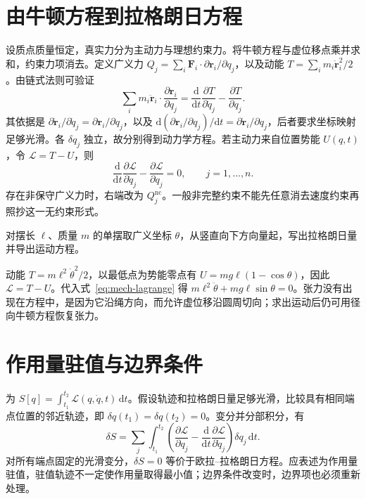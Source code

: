 \documentclass[UTF8,12pt,a4paper,fontset=fandol]{ctexbook}
\begin{document}
\section{由牛顿方程到拉格朗日方程}
设质点质量恒定，真实力分为主动力与理想约束力。将牛顿方程与虚位移点乘并求和，约束力项消去。定义广义力 $Q_j=\sum_i\mathbf F_i\cdot\partial\mathbf r_i/\partial q_j$，以及动能 $T=\sum_i m_i\dot{\mathbf r}_i^2/2$。由链式法则可验证
\[
 \sum_i m_i\ddot{\mathbf r}_i\cdot\frac{\partial\mathbf r_i}{\partial q_j}
 =\frac{\mathrm d}{\mathrm dt}\frac{\partial T}{\partial\dot q_j}-\frac{\partial T}{\partial q_j}.
\]
其依据是 $\partial\dot{\mathbf r}_i/\partial\dot q_j=\partial\mathbf r_i/\partial q_j$，以及 $\mathrm d(\partial\mathbf r_i/\partial q_j)/\mathrm dt=\partial\dot{\mathbf r}_i/\partial q_j$，后者要求坐标映射足够光滑。各 $\delta q_j$ 独立，故分别得到动力学方程。若主动力来自位置势能 $U(q,t)$，令 $\mathcal L=T-U$，则
\begin{equation}
 \frac{\mathrm d}{\mathrm dt}\frac{\partial\mathcal L}{\partial\dot q_j}
 -\frac{\partial\mathcal L}{\partial q_j}=0,\qquad j=1,\ldots,n.
 \label{eq:mech-lagrange}
\end{equation}
存在非保守广义力时，右端改为 $Q_j^{\mathrm{nc}}$。一般非完整约束不能先任意消去速度约束再照抄这一无约束形式。

\begin{example}[用广义坐标求单摆方程]
对摆长 $\ell$、质量 $m$ 的单摆取广义坐标 $\theta$，从竖直向下方向量起，写出拉格朗日量并导出运动方程。
\end{example}
\begin{solve}
动能 $T=m\ell^2\dot\theta^2/2$，以最低点为势能零点有 $U=mg\ell(1-\cos\theta)$，因此 $\mathcal L=T-U$。代入式~\eqref{eq:mech-lagrange} 得 $m\ell^2\ddot\theta+mg\ell\sin\theta=0$。张力没有出现在方程中，是因为它沿绳方向，而允许虚位移沿圆周切向；求出运动后仍可用径向牛顿方程恢复张力。
\end{solve}

\section{作用量驻值与边界条件}
为 $S[q]=\int_{t_1}^{t_2}\mathcal L(q,\dot q,t)\,\mathrm dt$。假设轨迹和拉格朗日量足够光滑，比较具有相同端点位置的邻近轨迹，即 $\delta q(t_1)=\delta q(t_2)=0$。变分并分部积分，有
\[
 \delta S=\sum_j\int_{t_1}^{t_2}
 \left(\frac{\partial\mathcal L}{\partial q_j}-\frac{\mathrm d}{\mathrm dt}\frac{\partial\mathcal L}{\partial\dot q_j}\right)\delta q_j\,\mathrm dt.
\]
对所有端点固定的光滑变分，$\delta S=0$ 等价于欧拉--拉格朗日方程。应表述为作用量驻值，驻值轨迹不一定使作用量取得最小值；边界条件改变时，边界项也必须重新处理。
\end{document}
